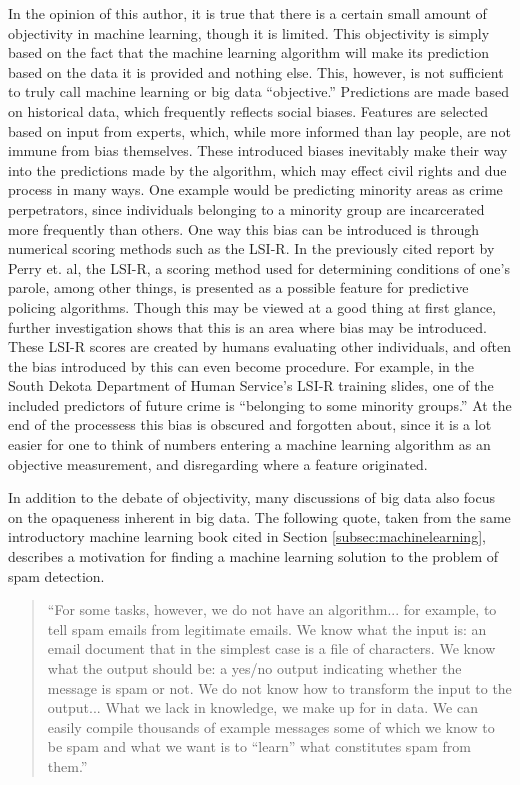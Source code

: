 \documentclass[12pt]{article} %
\begin{document}
In the opinion of this author, it is true that there is a certain small amount of objectivity in machine learning, though it is limited. This objectivity is simply based on the fact that the machine learning algorithm will make its prediction based on the data it is provided and nothing else. This, however, is not sufficient to truly call machine learning or big data ``objective.'' Predictions are made based on historical data, which frequently reflects social biases. Features are selected based on input from experts, which, while more informed than lay people, are not immune from bias themselves. These introduced biases inevitably make their way into the predictions made by the algorithm, which may effect civil rights and due process in many ways. One example would be predicting minority areas as crime perpetrators, since individuals belonging to a minority group are incarcerated more frequently than others. \cite{naacp} One way this bias can be introduced is through numerical scoring methods such as the LSI-R. In the previously cited report by Perry et. al, the LSI-R, a scoring method used for determining conditions of one's parole, among other things, is presented as a possible feature for predictive policing algorithms. Though this may be viewed at a good thing at first glance, further investigation shows that this is an area where bias may be introduced. These LSI-R scores are created by humans evaluating other individuals, and often the bias introduced by this can even become procedure. For example, in the South Dekota Department of Human Service's LSI-R training slides, one of the included predictors of future crime is ``belonging to some minority groups.'' \cite{dekota} At the end of the processess this bias is obscured and forgotten about, since it is a lot easier for one to think of numbers entering a machine learning algorithm as an objective measurement, and disregarding where a feature originated.

In addition to the debate of objectivity, many discussions of big data also focus on the opaqueness inherent in big data.\cite{pasquale2015black} The following quote, taken from the same introductory machine learning book cited in Section \ref{subsec:machinelearning}, describes a motivation for finding a machine learning solution to the problem of spam detection. \cite{introduction}
\begin{quote}
``For some tasks, however, we do not have an algorithm... for example,
to tell spam emails from legitimate emails.  We know what the input is:
an email document that in the simplest case is a file of characters.  We
know what the output should be: a yes/no output indicating whether the
message is spam or not.  We do not know how to transform the input
to the output... 
What we lack in  knowledge,  we make up for in  data.   We can  easily
compile thousands of example messages some of which we know to be
spam and what we want is to ``learn'' what constitutes spam from them.''
\end{quote} 
\end{document}
